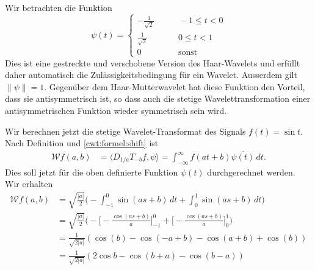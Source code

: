 \begin{beispiel}
Wir betrachten die Funktion
\begin{equation}
\psi(t) = \begin{cases}
-\frac1{\sqrt{2}}&\qquad -1\le t< 0\\
\frac1{\sqrt{2}}&\qquad 0\le t< 1\\
0&\qquad\text{sonst}
\end{cases}
\label{cwt:beispiel:psi}
\end{equation}
Dies ist eine gestreckte und verschobene Version des Haar-Wavelets
und erfüllt daher automatisch die Zulässigkeitsbedingung für ein Wavelet.
Ausserdem gilt $\|\psi\|=1$.
Gegenüber dem Haar-Mutterwavelet hat diese Funktion den Vorteil, dass 
sie antisymmetrisch ist, so dass auch die stetige Wavelettransformation
einer antisymmetrischen Funktion wieder symmetrisch sein wird.

Wir berechnen jetzt die stetige Wavelet-Transformat des Signals $f(t)=\sin t$.
Nach Definition und
\eqref{cwt:formel:shift}
ist
\begin{align*}
\mathcal{W}f(a,b)
&=
\langle D_{1/a}T_{-b}f,\psi\rangle
=
\int_{-\infty}^\infty f(at+b) \overline{\psi(t)}\,dt.
\end{align*}
Dies soll jetzt für die oben definierte Funktion $\psi(t)$ durchgerechnet
werden.
Wir erhalten
\begin{align*}
\mathcal{W}f(a,b)
&=
\sqrt{\frac{|a|}{2}}
\biggl(
-
\int_{-1}^0 \sin(as+b)\,dt
+
\int_{0}^1 \sin(as+b)\,dt
\biggr)
\\
&=
\sqrt{\frac{|a|}{2}}
\biggl(
-
\biggl[-\frac{\cos(as+b)}{a}\biggr]_{-1}^0
+
\biggl[-\frac{\cos(as+b)}{a}\biggr]_{0}^1
\biggr)
\\
&=
\frac{1}{\sqrt{2|a|}}
(
\cos(b) - \cos(-a+b) -\cos(a+b)+\cos(b)
)
\\
&=
\frac{1}{\sqrt{2|a|}}
(2\cos b - \cos(b+a) - \cos(b-a))
\end{align*}


\end{beispiel}

